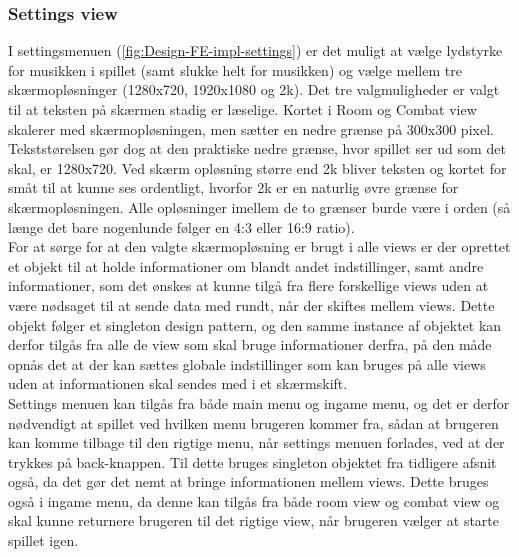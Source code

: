 \subsubsection{Settings view}

I settingsmenuen (\autoref{fig:Design-FE-impl-settings}) er det muligt at vælge lydstyrke for musikken i spillet (samt slukke helt for musikken) og vælge mellem tre skærmopløsninger (1280x720, 1920x1080 og 2k). Det tre valgmuligheder er valgt til at teksten på skærmen stadig er læselige. Kortet i Room og Combat view skalerer med skærmopløsningen, men sætter en nedre grænse på 300x300 pixel. Tekststørelsen gør dog at den praktiske nedre grænse, hvor spillet ser ud som det skal, er 1280x720. Ved skærm opløsning større end 2k bliver teksten og kortet for småt til at kunne ses ordentligt, hvorfor 2k er en naturlig øvre grænse for skærmopløsningen. Alle opløsninger imellem de to grænser burde være i orden (så længe det bare nogenlunde følger en 4:3 eller 16:9 ratio).\\

\noindent For at sørge for at den valgte skærmopløsning er brugt i alle views er der oprettet et objekt til at holde informationer om blandt andet indstillinger, samt andre informationer, som det ønskes at kunne tilgå fra flere forskellige views uden at være nødsaget til at sende data med rundt, når der skiftes mellem views. Dette objekt følger et singleton design pattern, og den samme instance af objektet kan derfor tilgås fra alle de view som skal bruge informationer derfra, på den måde opnås det at der kan sættes globale indstillinger som kan bruges på alle views uden at informationen skal sendes med i et skærmskift.\\

\noindent
Settings menuen kan tilgås fra både main menu og ingame menu, og det er derfor nødvendigt at spillet ved hvilken menu brugeren kommer fra, sådan at brugeren kan komme tilbage til den rigtige menu, når settings menuen forlades, ved at der trykkes på back-knappen. Til dette bruges singleton objektet fra tidligere afsnit også, da det gør det nemt at bringe informationen mellem views. Dette bruges også i ingame menu, da denne kan tilgås fra både room view og combat view og skal kunne returnere brugeren til det rigtige view, når brugeren vælger at starte spillet igen.

